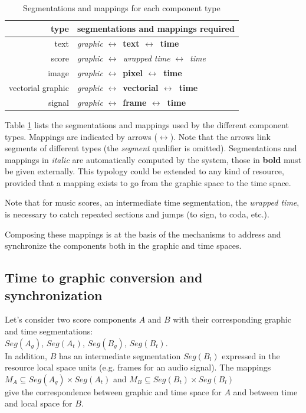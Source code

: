 \documentclass[twoside,10pt]{article}
\newcommand{\seg}[1]			{Seg(#1)}
\newcommand{\lra}			{$\leftrightarrow$}
\newcommand{\rshift}			{\hspace*{4mm}}
\begin{document}
\begin{table}[htdp]
\begin{center}
\begin{tabular}{|r|l|}
\hline
type & segmentations and mappings required \\
\hline
text		& \textit{graphic} \lra\ \textbf{text  \lra\ time} \\
score		& \textit{graphic \lra\ wrapped time} \lra\ \textit{time} \\
image		& \textit{graphic} \lra\ \textbf{pixel \lra\ time} \\
vectorial graphic	&  \textit{graphic} \lra\ \textbf{vectorial \lra\ time} \\
signal		&  \textit{graphic} \lra\ \textbf{frame \lra\ time} \\
\hline
\end{tabular}
\end{center}
\caption{Segmentations and mappings for each component type}
\label{maptable}
\end{table}

Table \ref{maptable} lists the segmentations and mappings used by the different component types. Mappings are indicated by arrows (\lra). Note that the arrows link segments of different types (the \emph{segment} qualifier is omitted). Segmentations and mappings in  \textit{italic} are automatically computed by the system, those in \textbf{bold} must be given externally. This typology could be extended to any kind of resource, provided that a mapping exists to go from the graphic space to the time space. 

Note that for music scores, an intermediate time segmentation, the \emph{wrapped time}, is necessary to catch repeated sections and jumps (to sign, to coda, etc.).

Composing these mappings is at the basis of the mechanisms to address and synchronize the components both in the graphic and time spaces.

\subsection{Time to graphic conversion and synchronization}


Let's consider two score components $A$ and $B$ with their corresponding graphic and time segmentations:\\
\rshift $\seg{A_g}$, $\seg{A_t}$, $\seg{B_g}$, $\seg{B_t}$. \\
In addition, $B$ has an intermediate segmentation $\seg{B_l}$ expressed in the resource local space units (e.g. frames for an audio signal).
The mappings \\
\rshift $M_A \subseteq \seg{A_{g}}\times \seg{A_{t}}$ and $M_B \subseteq \seg{B_{t}}\times \seg{B_{l}}$ \\
give the correspondence between graphic and time space for $A$ and between time and local space for $B$.
\end{document}
